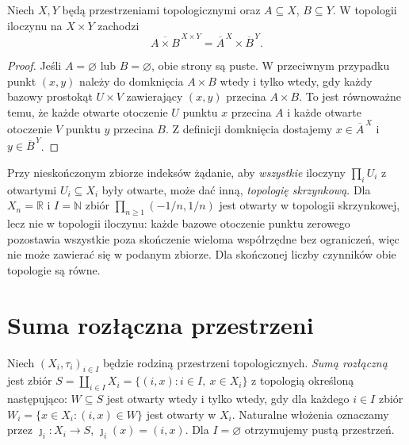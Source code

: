 \begin{stwierdzenie}
\label{prop:topog-iloczyn-domkniecie}
Niech $X,Y$ będą przestrzeniami topologicznymi oraz
$A\subseteq X$, $B\subseteq Y$. W topologii iloczynu
na $X\times Y$ zachodzi
\[
\overline{A\times B}^{\,X\times Y}
 =\overline A^{\,X}\times\overline B^{\,Y}.
\]
\end{stwierdzenie}
\begin{proof}
Jeśli $A=\varnothing$ lub $B=\varnothing$, obie strony
są puste. W przeciwnym przypadku punkt $(x,y)$ należy
do domknięcia $A\times B$ wtedy i tylko wtedy, gdy każdy
bazowy prostokąt $U\times V$ zawierający $(x,y)$ przecina
$A\times B$. To jest równoważne temu, że każde otwarte
otoczenie $U$ punktu $x$ przecina $A$ i każde otwarte
otoczenie $V$ punktu $y$ przecina $B$.
Z definicji domknięcia dostajemy
$x\in\overline A^{\,X}$ i $y\in\overline B^{\,Y}$.
\end{proof}

\begin{uwaga}
\label{rem:topog-iloczyn-skrzynkowa}
Przy nieskończonym zbiorze indeksów żądanie, aby
\emph{wszystkie} iloczyny $\prod_i U_i$ z otwartymi
$U_i\subseteq X_i$ były otwarte, może dać inną,
\emph{topologię skrzynkową}. Dla $X_n=\mathbb R$ i
$I=\mathbb N$ zbiór $\prod_{n\ge1}(-1/n,1/n)$ jest
otwarty w topologii skrzynkowej, lecz nie w topologii
iloczynu: każde bazowe otoczenie punktu zerowego
pozostawia wszystkie poza skończenie wieloma współrzędne
bez ograniczeń, więc nie może zawierać się w podanym
zbiorze. Dla skończonej liczby czynników obie topologie
są równe.
\end{uwaga}

\section{Suma rozłączna przestrzeni}
\label{sec:topog-suma-rozlaczna}

\begin{definicja}
\label{def:topog-suma-rozlaczna}
Niech $(X_i,\tau_i)_{i\in I}$ będzie rodziną przestrzeni
topologicznych. \emph{Sumą rozłączną} jest zbiór
$S=\coprod_{i\in I}X_i=\{(i,x):i\in I,\ x\in X_i\}$
z topologią określoną następująco: $W\subseteq S$ jest
otwarty wtedy i tylko wtedy, gdy dla każdego $i\in I$
zbiór $W_i=\{x\in X_i:(i,x)\in W\}$ jest otwarty
w $X_i$. Naturalne włożenia oznaczamy przez
$\jmath_i\colon X_i\to S$, $\jmath_i(x)=(i,x)$.
Dla $I=\varnothing$ otrzymujemy pustą przestrzeń.
\end{definicja}

